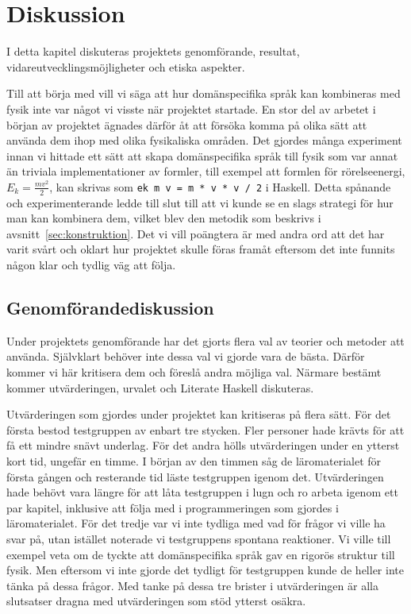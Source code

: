 
\chapter{Diskussion}

I detta kapitel diskuteras projektets genomförande, resultat,
vidareutvecklingsmöjligheter och etiska aspekter.

Till att börja med vill vi säga att hur domänspecifika språk kan kombineras med
fysik inte var något vi visste när projektet startade. En stor del av arbetet i
början av projektet ägnades därför åt att försöka komma på olika sätt att
använda dem ihop med olika fysikaliska områden. Det gjordes många experiment
innan vi hittade ett sätt att skapa domänspecifika språk till fysik som var annat än
triviala implementationer av formler, till exempel att formlen för
rörelseenergi, $E_k = \frac{mv^2}{2}$, kan skrivas som \texttt{ek m v = m * v *
v / 2} i Haskell. Detta spånande och experimenterande ledde till slut till att
vi kunde se en slags strategi för hur man kan kombinera dem, vilket blev den
metodik som beskrivs i avsnitt~\ref{sec:konstruktion}. Det vi vill poängtera är
med andra ord att det har varit svårt och oklart hur projektet skulle föras
framåt eftersom det inte funnits någon klar och tydlig väg att följa.

\section{Genomförandediskussion}

Under projektets genomförande har det gjorts flera val av teorier och metoder
att använda. Självklart behöver inte dessa val vi gjorde vara de bästa.
Därför kommer vi här kritisera dem och föreslå andra möjliga val. Närmare
bestämt kommer utvärderingen, urvalet och Literate Haskell diskuteras.

Utvärderingen som gjordes under projektet kan kritiseras på flera sätt. För det
första bestod testgruppen av enbart tre stycken. Fler
personer hade krävts för att få ett mindre snävt underlag. För det andra hölls
utvärderingen under en ytterst kort tid, ungefär en timme. I början av den
timmen såg de läromaterialet för första gången och resterande tid läste
testgruppen igenom det. Utvärderingen hade behövt vara längre för att låta testgruppen
i lugn och ro arbeta igenom ett par kapitel, inklusive att följa med i
programmeringen som gjordes i läromaterialet. För det tredje var vi inte tydliga
med vad för frågor vi ville ha svar på, utan istället noterade vi testgruppens
spontana reaktioner. Vi ville till exempel veta om de tyckte att domänspecifika
språk gav en rigorös struktur till fysik. Men eftersom vi inte gjorde det
tydligt för testgruppen kunde de heller inte tänka på dessa frågor. Med tanke på
dessa tre brister i utvärderingen är alla slutsatser dragna med utvärderingen
som stöd ytterst osäkra.

